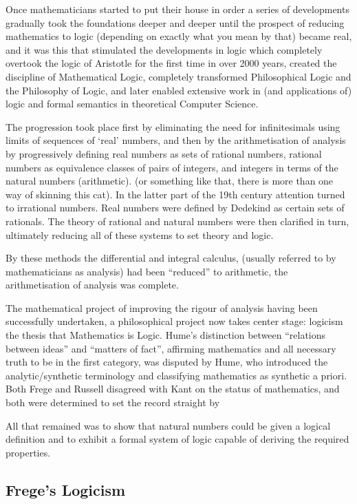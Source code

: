 \documentclass[10pt,titlepage]{book}
\begin{document}
Once mathematicians started to put their house in order a series of developments gradually took the foundations deeper and deeper until the prospect of reducing mathematics to logic (depending on exactly what you mean by that) became real, and it was this that stimulated the developments in logic which completely overtook the logic of Aristotle for the first time in over 2000 years, created the discipline of Mathematical Logic, completely transformed Philosophical Logic and the Philosophy of Logic, and later enabled extensive work in (and applications of) logic and formal semantics in theoretical Computer Science.

The progression took place first by eliminating the need for infinitesimals using limits of sequences of `real' numbers, and then by the arithmetisation of analysis by progressively defining real numbers as sets of rational numbers, rational numbers as equivalence classes of pairs of integers, and integers in terms of the natural numbers (arithmetic). (or something like that, there is more than one way of skinning this cat).
In the latter part of the 19th century attention turned to irrational numbers.
Real numbers were defined by Dedekind as certain sets of rationals.
The theory of rational and natural numbers were then clarified in turn, ultimately reducing all of these systems to set theory and logic.

By these methods the differential and integral calculus, (usually referred to by mathematicians as analysis) had been ``reduced'' to arithmetic, the arithmetisation of analysis was complete.

The mathematical project of improving the rigour of analysis having been successfully undertaken, a philosophical project now takes center stage: logicism the thesis that Mathematics is Logic.
Hume's distinction between ``relations between ideas'' and ``matters of fact'', affirming mathematics and all necessary truth to be in the first category, was disputed by Hume, who introduced the analytic/synthetic terminology and classifying mathematics as synthetic a priori.
Both Frege and Russell disagreed with Kant on the status of mathematics, and both were determined to set the record straight by

All that remained was to show that natural numbers could be given a logical definition and to exhibit a formal system of logic capable of deriving the required properties.

\subsection{Frege's Logicism}
\end{document}
